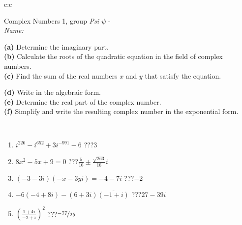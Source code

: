 \documentclass[10pt]{report}
\begin{document}
\begin{tabular}{c:c}
\begin{minipage}[c][104.5mm][t]{0.5\linewidth}
\begin{center}
\vspace{5mm}
{\huge Complex Numbers 1, group \textit{Psi $\psi$} -}\\[5mm]
\textit{Name:}\phantom{xxxxxxxxxxxxxxxxxxxxxxxxxxxxxxxxxxxxxxxxxxxxxxxxxxxxxxxxxxxxxxxxx}\\[5mm]
\begin{minipage}{0.95\linewidth}
\begin{center}
{\small \begin{minipage}{0.44\textwidth} \raggedright
\textbf{(a)} Determine the imaginary part. \\[1mm]
\textbf{(b)} Calculate the roots of the quadratic equation in the field of complex numbers. \\[1mm]
\textbf{(c)} Find the sum of the real numbers \(x\) and \(y\) that satisfy the equation. \end{minipage} \begin{minipage}{0.54\textwidth}
\textbf{(d)} Write in the algebraic form. \\[1mm]
\textbf{(e)} Determine the real part of the complex number. \\[1mm]
\textbf{(f)} Simplify and write the resulting complex number in the exponential form.
\end{minipage}
} \vspace{3mm}
\end{center}
\end{minipage}
\\[1mm]
\begin{minipage}{0.79\linewidth}
\begin{center}
\begin{varwidth}{\linewidth}
\setlength{\itemsep}{0pt}
\begin{enumerate}
\large
\item $i^{226}-i^{652}+3i^{-991}-6$\quad \dotfill\; ???\;\dotfill \quad $3$
\item $8x^2-5x+9=0$\quad \dotfill\; ???\;\dotfill \quad $\frac{5}{16} \pm{}\frac{ \sqrt{263}}{16}i$
\item $(-3-3i)(-x-3yi)=-4-7i$\quad \dotfill\; ???\;\dotfill \quad $-2$
\item $-6(-4+8i)-(6+3i)\overline{(-1+i)}$\quad \dotfill\; ???\;\dotfill \quad $27-39i$
\item $\left(\frac{1+4i}{-2+i}\right)^2$\quad \dotfill\; ???\;\dotfill \quad $\nicefrac{-77}{25}$

\end{enumerate}
\end{varwidth}
\end{center}
\end{minipage}
\end{center}
\end{minipage}
\end{tabular}
\end{document}
